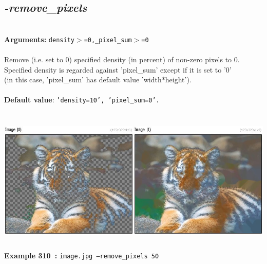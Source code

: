 \documentclass[a4paper,11pt,twoside]{book}
\begin{document}
\subsection{\emph{-remove\_pixels} }\vspace*{-0.5em}
~\\\textbf{Arguments: } 
{\small \texttt{density$>$=0,\_pixel\_sum$>$=0}}\\~\\
Remove (i.e. set to 0) specified density (in percent) of non-zero pixels to 0.
~\\Specified density is regarded against 'pixel\_sum' except if it is set to '0'
~\\(in this case, 'pixel\_sum' has default value 'width*height').
~\\~\\\textbf{Default value}: {\small \texttt{'density=10', 'pixel\_sum=0'.}}
\begin{center}\includegraphics[keepaspectratio=true,height=7cm,width=\textwidth]{img/gmic_def310.jpg}\\
{\footnotesize \textbf{Example 310~:} \texttt{image.jpg --remove\_pixels 50}}
\end{center}
\end{document}
